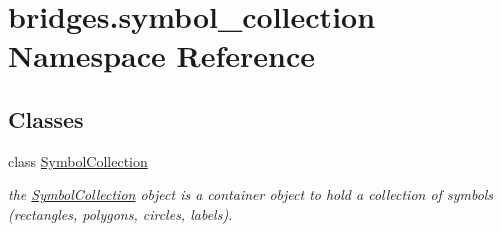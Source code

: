 \hypertarget{namespacebridges_1_1symbol__collection}{}\section{bridges.\+symbol\+\_\+collection Namespace Reference}
\label{namespacebridges_1_1symbol__collection}
\subsection*{Classes}
\begin{DoxyCompactItemize}
\item 
class \mbox{\hyperlink{classbridges_1_1symbol__collection_1_1_symbol_collection}{Symbol\+Collection}}
\begin{DoxyCompactList}\small\item\em the \mbox{\hyperlink{classbridges_1_1symbol__collection_1_1_symbol_collection}{Symbol\+Collection}} object is a container object to hold a collection of symbols (rectangles, polygons, circles, labels). \end{DoxyCompactList}\end{DoxyCompactItemize}
